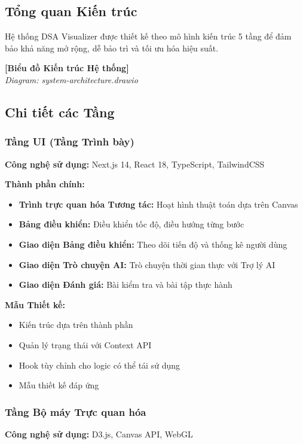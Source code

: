 \subsection{Tổng quan Kiến trúc}
\label{subsec:architecture-overview}

Hệ thống DSA Visualizer được thiết kế theo mô hình kiến trúc 5 tầng để đảm bảo khả năng mở rộng, dễ bảo trì và tối ưu hóa hiệu suất.

\begin{center}
\textbf{[Biểu đồ Kiến trúc Hệ thống]}\\
\textit{Diagram: system-architecture.drawio}
\end{center}

\subsection{Chi tiết các Tầng}

\subsubsection{Tầng UI (Tầng Trình bày)}
\textbf{Công nghệ sử dụng:} Next.js 14, React 18, TypeScript, TailwindCSS

\textbf{Thành phần chính:}
\begin{itemize}
    \item \textbf{Trình trực quan hóa Tương tác:} Hoạt hình thuật toán dựa trên Canvas
    \item \textbf{Bảng điều khiển:} Điều khiển tốc độ, điều hướng từng bước
    \item \textbf{Giao diện Bảng điều khiển:} Theo dõi tiến độ và thống kê người dùng
    \item \textbf{Giao diện Trò chuyện AI:} Trò chuyện thời gian thực với Trợ lý AI
    \item \textbf{Giao diện Đánh giá:} Bài kiểm tra và bài tập thực hành
\end{itemize}

\textbf{Mẫu Thiết kế:}
\begin{itemize}
    \item Kiến trúc dựa trên thành phần
    \item Quản lý trạng thái với Context API
    \item Hook tùy chỉnh cho logic có thể tái sử dụng
    \item Mẫu thiết kế đáp ứng
\end{itemize}

\subsubsection{Tầng Bộ máy Trực quan hóa}
\textbf{Công nghệ sử dụng:} D3.js, Canvas API, WebGL

